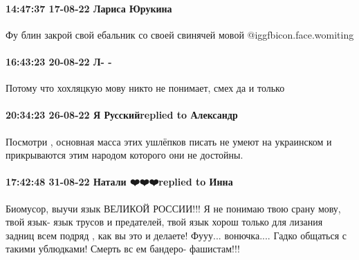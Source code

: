  
 
 
 
 

\paragraph{14:47:37 17-08-22 Лариса Юрукина}

Фу блин закрой свой ебальник со своей свинячей мовой  @igg{fbicon.face.womiting} 

\paragraph{16:43:23 20-08-22 Л- -}

Потому что хохляцкую мову никто не понимает, смех да и только

\paragraph{20:34:23 26-08-22 Я Русскийreplied to Александр}

Посмотри , основная масса этих ушлёпков писать не умеют на украинском и
прикрываются этим народом которого они не достойны.


\paragraph{17:42:48 31-08-22 Натали ❤️❤️❤️replied to Инна}

Биомусор, выучи язык ВЕЛИКОЙ РОССИИ!!! Я не понимаю твою срану мову, твой язык-
язык трусов и предателей, твой язык хорош только для лизания задниц всем подряд
, как вы это и делаете! Фууу... вонючка.... Гадко общаться с такими ублюдками!
Смерть вс ем бандеро- фашистам!!!

